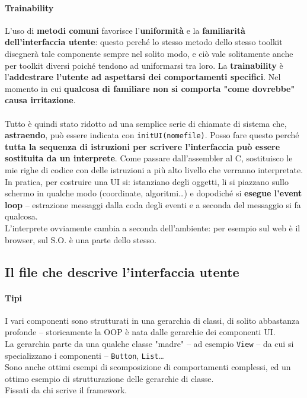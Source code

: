 \documentclass[10pt]{article}
\begin{document}
\paragraph{Trainability} L'uso di \textbf{metodi comuni} favorisce l'\textbf{uniformità} e la \textbf{familiarità dell'interfaccia utente}: questo perché lo stesso metodo dello stesso toolkit disegnerà tale componente sempre nel solito modo, e ciò vale solitamente anche per toolkit diversi poiché tendono ad uniformarsi tra loro. La \textbf{trainability} è l'\textbf{addestrare l'utente ad aspettarsi dei comportamenti specifici}. Nel momento in cui \textbf{qualcosa di familiare non si comporta "come dovrebbe" causa irritazione}.
\paragraph{} Tutto è quindi stato ridotto ad una semplice serie di chiamate di sistema che, \textbf{astraendo}, può essere indicata con \texttt{initUI(nomefile)}. Posso fare questo perché \textbf{tutta la sequenza di istruzioni per scrivere l'interfaccia può essere sostituita da un interprete}. Come passare dall'assembler al C, sostituisco le mie righe di codice con delle istruzioni a più alto livello che verranno interpretate.\\
In pratica, per costruire una UI si: istanziano degli oggetti, li si piazzano sullo schermo in qualche modo (coordinate, algoritmi\ldots) e dopodiché si \textbf{esegue l'event loop} -- estrazione messaggi dalla coda degli eventi e a seconda del messaggio si fa qualcosa.\\
L'interprete ovviamente cambia a seconda dell'ambiente: per esempio sul web è il browser, sul S.O. è una parte dello stesso.
\subsection{Il file che descrive l'interfaccia utente}
\paragraph{Tipi} I vari componenti sono strutturati in una gerarchia di classi, di solito abbastanza profonde -- storicamente la OOP è nata dalle gerarchie dei componenti UI.\\
La gerarchia parte da una qualche classe "madre" -- ad esempio \texttt{View} -- da cui si specializzano i componenti -- \texttt{Button}, \texttt{List}\ldots\\
Sono anche ottimi esempi di scomposizione di comportamenti complessi, ed un ottimo esempio di strutturazione delle gerarchie di classe.\\
Fissati da chi scrive il framework.
\end{document}
